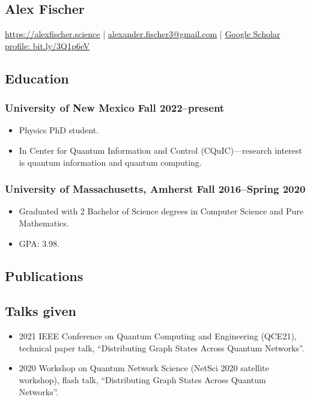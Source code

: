 \documentclass{article}
\begin{document}
	\begin{center}
		\section*{Alex Fischer}
			\href{https://alexfischer.science}{https://alexfischer.science} |
			\href{mailto:alexander.fischer3@gmail.com}{alexander.fischer3@gmail.com} | \href{https://scholar.google.com/citations?user=CfhWaI4AAAAJ&hl=en}{Google Scholar profile: bit.ly/3Q1p6eV}
    \end{center}
	\subsection*{Education}
		\subsubsection*{University of New Mexico \hfill \normalfont \normalsize Fall 2022--present}
			\begin{itemize}
				\item Physics PhD student.
				\item In Center for Quantum Information and Control (CQuIC)---research interest is quantum information and quantum computing.
			\end{itemize}
		\subsubsection*{University of Massachusetts, Amherst \hfill \normalfont \normalsize Fall 2016--Spring 2020}
			\begin{itemize}
				\item Graduated with 2 Bachelor of Science degrees in Computer Science and Pure Mathematics.
				\item GPA: 3.98.
			\end{itemize}
	\subsection*{Publications}
		\nocite{*}
		
		{}
	\subsection*{Talks given}
		\begin{itemize}
			\item 2021 IEEE Conference on Quantum Computing and Engineering (QCE21), technical paper talk, ``Distributing Graph States Across Quantum Networks''.
			\item 2020 Workshop on Quantum Network Science (NetSci 2020 satellite workshop), flash talk, ``Distributing Graph States Across Quantum Networks''.
		\end{itemize}
\end{document}
